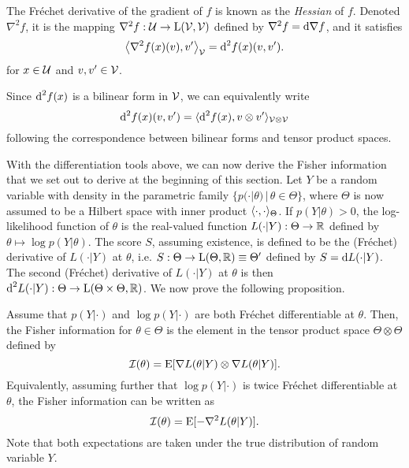 \begin{definition}[Hessian]
  The Fréchet derivative of the gradient of $f$ is known as the \emph{Hessian} of $f$.
  Denoted $\nabla^2 f$, it is the mapping $\nabla^2 f: {\mathcal U} \to \text{L}({\mathcal V},{\mathcal V})$ defined by $\nabla^2 f  = \text{d} \nabla f$, and it satisfies
  \[
    \left\langle \nabla^2 f(x)(v) , v' \right\rangle_{\mathcal V} = \text{d}^2 f(x)(v,v').
  \]
  for $x\in{\mathcal U}$ and $v,v'\in{\mathcal V}$.
\end{definition}

\begin{remark}
  Since $\text{d}^2 f(x)$ is a bilinear form in ${\mathcal V}$, we can equivalently write
  \[
    \text{d}^2 f(x)(v,v') = \langle\text{d}^2 f(x), v \otimes v'\rangle_{{\mathcal V}\otimes{\mathcal V}}
  \]
  following the correspondence between bilinear forms and tensor product spaces.  
\end{remark}

With the differentiation tools above, we can now derive the Fisher information that we set out to derive at the beginning of this section.
Let $Y$ be a random variable with density in the parametric family $\{p(\cdot|\theta) \,|\, \theta \in \Theta \}$, where $\Theta$ is now assumed to be a Hilbert space with inner product $\langle\cdot,\cdot\rangle_\Theta$.
If $p(Y|\theta) > 0$, the log-likelihood function of $\theta$ is the real-valued function $L(\cdot|Y):\Theta\to\mathbb{R}$ defined by $\theta \mapsto \log p(Y|\theta)$. 
The score $S$, assuming existence, is defined to be the (Fréchet) derivative of $L(\cdot|Y)$ at $\theta$, i.e. $S:\Theta \to \text{L}(\Theta,\mathbb{R}) \equiv \Theta'$ defined by $S = \text{d} L(\cdot | Y)$.
The second (Fréchet) derivative of $L(\cdot|Y)$ at $\theta$ is then $\text{d}^2 L(\cdot|Y): \Theta \to \text{L}(\Theta \times \Theta,\mathbb{R})$.
We now prove the following proposition.

\begin{proposition}\label{thm:fisherinfohilbert}
  Assume that $p(Y|\cdot)$ and $\log p(Y|\cdot)$ are both Fréchet differentiable at $\theta$.
  Then, the Fisher information for $\theta\in\Theta$ is the element in the tensor product space $\Theta \otimes \Theta$ defined by
  \[
    {\mathcal I}(\theta) = \operatorname{E} [\nabla L(\theta|Y) \otimes \nabla L(\theta|Y)].
  \]  
  Equivalently, assuming further that $\log p(Y|\cdot)$ is twice Fréchet differentiable at $\theta$, the Fisher information can be written as
  \[
    {\mathcal I}(\theta) = \operatorname{E}[-\nabla^2 L(\theta|Y)].
  \]
  Note that both expectations are taken under the true distribution of random variable $Y$.
\end{proposition}

